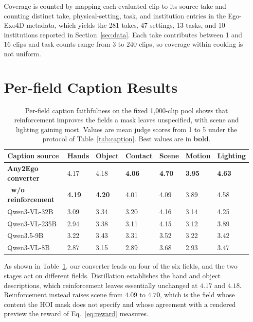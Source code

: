 \documentclass{article}
\begin{document}
Coverage is counted by mapping each evaluated clip to its source take and
counting distinct take, physical-setting, task, and institution entries in the
Ego-Exo4D metadata, which yields the 281 takes, 47 settings, 13 tasks, and 10
institutions reported in Section~\ref{sec:data}. Each take contributes between
1 and 16 clips and task counts range from 3 to 240 clips, so coverage within
cooking is not uniform.

\section{Per-field Caption Results}
\label{app:caption}

\begin{table}[t]
\centering\small
\caption{Per-field caption faithfulness on the fixed 1{,}000-clip pool shows
that reinforcement improves the fields a mask leaves unspecified, with scene
and lighting gaining most. Values are mean judge scores from 1 to 5 under the
protocol of Table~\ref{tab:caption}. Best values are in \textbf{bold}.}
\label{tab:fields}
\begin{tabular}{lC{1.3cm}C{1.3cm}C{1.3cm}C{1.3cm}C{1.3cm}C{1.3cm}}
\toprule
\textbf{Caption source} & \textbf{Hands} & \textbf{Object} & \textbf{Contact} & \textbf{Scene} & \textbf{Motion} & \textbf{Lighting} \\
\midrule
\textbf{Any2Ego converter} & 4.17 & 4.18 & \textbf{4.06} & \textbf{4.70} & \textbf{3.95} & \textbf{4.63} \\
\textbf{$\;\;$w/o reinforcement} & \textbf{4.19} & \textbf{4.20} & 4.01 & 4.09 & 3.89 & 4.58 \\
\midrule
Qwen3-VL-32B & 3.09 & 3.34 & 3.20 & 4.16 & 3.14 & 4.25 \\
Qwen3-VL-235B & 2.94 & 3.38 & 3.11 & 4.15 & 3.12 & 3.89 \\
Qwen3.5-9B & 3.22 & 3.43 & 3.31 & 3.52 & 3.22 & 3.42 \\
Qwen3-VL-8B & 2.87 & 3.15 & 2.89 & 3.68 & 2.93 & 3.47 \\
\bottomrule
\end{tabular}
\end{table}

As shown in Table~\ref{tab:fields}, our converter leads on four of the six
fields, and the two stages act on different fields. Distillation establishes the
hand and object descriptions, which reinforcement leaves essentially unchanged at
$4.17$ and $4.18$. Reinforcement instead raises scene from $4.09$ to $4.70$,
which is the field whose content the HOI mask does not specify and whose
agreement with a rendered preview the reward of Eq.~\ref{eq:reward} measures.
\end{document}
